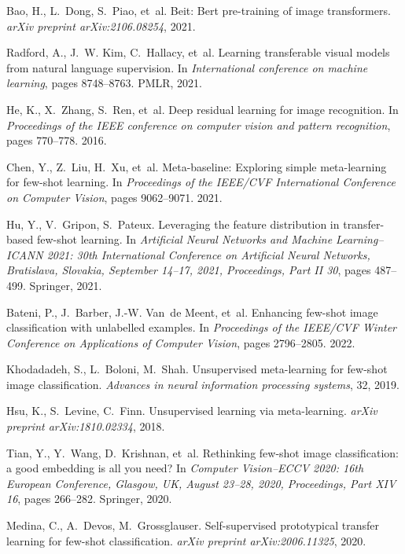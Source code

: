 \documentclass{article}
\begin{document}
\begin{thebibliography}{10}
	Bao, H., L.~Dong, S.~Piao, et~al.
	\newblock Beit: Bert pre-training of image transformers.
	\newblock \emph{arXiv preprint arXiv:2106.08254}, 2021.
	
	Radford, A., J.~W. Kim, C.~Hallacy, et~al.
	\newblock Learning transferable visual models from natural language
	supervision.
	\newblock In \emph{International conference on machine learning}, pages
	8748--8763. PMLR, 2021.
	
	He, K., X.~Zhang, S.~Ren, et~al.
	\newblock Deep residual learning for image recognition.
	\newblock In \emph{Proceedings of the IEEE conference on computer vision and
		pattern recognition}, pages 770--778. 2016.
	
	Chen, Y., Z.~Liu, H.~Xu, et~al.
	\newblock Meta-baseline: Exploring simple meta-learning for few-shot learning.
	\newblock In \emph{Proceedings of the IEEE/CVF International Conference on
		Computer Vision}, pages 9062--9071. 2021.
	
	Hu, Y., V.~Gripon, S.~Pateux.
	\newblock Leveraging the feature distribution in transfer-based few-shot
	learning.
	\newblock In \emph{Artificial Neural Networks and Machine Learning--ICANN 2021:
		30th International Conference on Artificial Neural Networks, Bratislava,
		Slovakia, September 14--17, 2021, Proceedings, Part II 30}, pages 487--499.
	Springer, 2021.
	
	Bateni, P., J.~Barber, J.-W. Van~de Meent, et~al.
	\newblock Enhancing few-shot image classification with unlabelled examples.
	\newblock In \emph{Proceedings of the IEEE/CVF Winter Conference on
		Applications of Computer Vision}, pages 2796--2805. 2022.
	
	Khodadadeh, S., L.~Boloni, M.~Shah.
	\newblock Unsupervised meta-learning for few-shot image classification.
	\newblock \emph{Advances in neural information processing systems}, 32, 2019.
	
	Hsu, K., S.~Levine, C.~Finn.
	\newblock Unsupervised learning via meta-learning.
	\newblock \emph{arXiv preprint arXiv:1810.02334}, 2018.
	
	Tian, Y., Y.~Wang, D.~Krishnan, et~al.
	\newblock Rethinking few-shot image classification: a good embedding is all you
	need?
	\newblock In \emph{Computer Vision--ECCV 2020: 16th European Conference,
		Glasgow, UK, August 23--28, 2020, Proceedings, Part XIV 16}, pages 266--282.
	Springer, 2020.
	
	Medina, C., A.~Devos, M.~Grossglauser.
	\newblock Self-supervised prototypical transfer learning for few-shot
	classification.
	\newblock \emph{arXiv preprint arXiv:2006.11325}, 2020.
	

\end{thebibliography}
\end{document}
